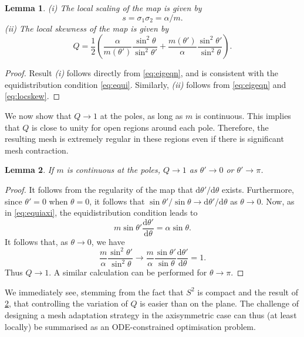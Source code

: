 \documentclass[11pt, a4paper]{scrartcl}  %
\theoremstyle{plain}
\newtheorem{lemma}{Lemma}
\theoremstyle{definition}
\numberwithin{equation}{section}
\newcommand{\dd}[2]{\frac{\mathrm{d} #1}{\mathrm{d} #2}}
\begin{document}
\begin{lemma}
\label{thm:axireg}
\emph{(i)} The local scaling of the map is given by
\begin{equation}
\label{eq:axiscale}
s = \sigma_1 \sigma_2 = \alpha/m.
\end{equation}
\emph{(ii)} The local skewness of the map is given by
\begin{equation}
\label{eq:Qaxi}
Q = \frac{1}{2} \left(\frac{\alpha}{m(\theta')} \frac{\sin^2\theta}{\sin^2\theta'} + \frac{m(\theta')}{\alpha}\frac{\sin^2\theta'}{\sin^2\theta} \right).
\end{equation}
\end{lemma}
\begin{proof}
Result \emph{(i)} follows directly from \cref{eq:eigeqn}, and is
consistent with the equidistribution condition \cref{eq:equi}.
Similarly, \emph{(ii)} follows from \cref{eq:eigeqn} and \cref{eq:locskew}.
\end{proof}

We now show that $Q \to 1$ at the poles, as long as $m$ is continuous.
This implies that $Q$ is close to unity for open regions around each
pole. Therefore, the resulting mesh is extremely regular in these
regions even if there is significant mesh contraction.

\begin{lemma}
\label{thm:poles}
If $m$ is continuous at the poles, $Q \to 1$ as $\theta' \to 0$ or
$\theta' \to \pi$.
\end{lemma}
\begin{proof}
It follows from the regularity of the map that
$\mathrm{d}\theta'/\mathrm{d} \theta$ exists. Furthermore, since
$\theta' = 0$ when $\theta = 0$, it follows that
$\sin\theta'/\sin\theta \to \mathrm{d}\theta'/\mathrm{d}\theta$ as
$\theta \to 0$. Now, as in \cref{eq:equiaxi}, the equidistribution
condition leads to
\begin{equation}
m \sin\theta' \dd{\theta'}{\theta} = \alpha \sin\theta.
\end{equation}
It follows that, as $\theta \to 0$, we have
\begin{equation}
\frac{m}{\alpha} \frac{\sin^2\theta'}{\sin^2\theta} \to \frac{m}{\alpha} \frac{\sin\theta'}{\sin\theta} \dd{\theta'}{\theta} = 1.
\end{equation}
Thus $Q \to 1$. A similar calculation can be performed for
$\theta \to \pi$.
\end{proof}
We immediately see, stemming from the fact that $S^2$ is compact and the
result of \cref{thm:poles}, that controlling the variation of $Q$ is
easier than on the plane. The challenge of designing a mesh adaptation
strategy in the axisymmetric case can thus (at least locally) be
summarised as an ODE-constrained optimisation problem.
\end{document}
